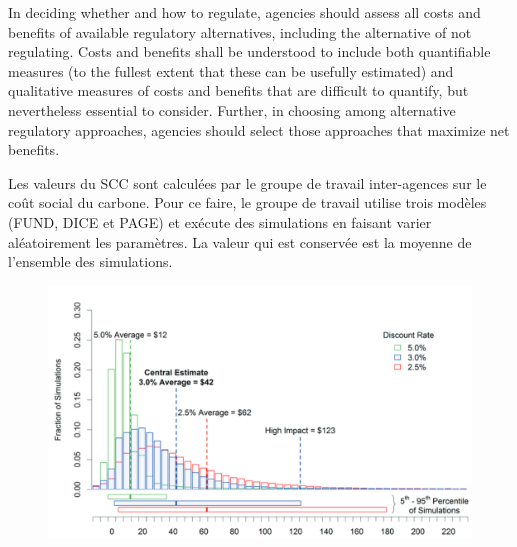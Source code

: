\begin{authoredquote}
     In deciding whether and how to regulate, agencies should assess all costs and benefits of available regulatory alternatives, including the alternative of not regulating. Costs and benefits shall be understood to include both quantifiable measures (to the fullest extent that these can be usefully estimated) and qualitative measures of costs and benefits that are difficult to quantify, but nevertheless essential to consider. Further, in choosing among alternative regulatory approaches, agencies should select those approaches that maximize net benefits. 
\end{authoredquote}

Les valeurs du \gls{SCC} sont calculées par le groupe de travail inter-agences sur le coût social du carbone. Pour ce faire, le groupe de travail utilise trois modèles (\gls{FUND}, \gls{DICE} et \gls{PAGE}) et exécute des simulations en faisant varier aléatoirement les paramètres. La valeur qui est conservée est la moyenne de l'ensemble des simulations. 

\begin{figure}
    \centering
    \includegraphics[width=0.9\linewidth]{figures/scc.png}
    \label{fig:scc}
\end{figure}


